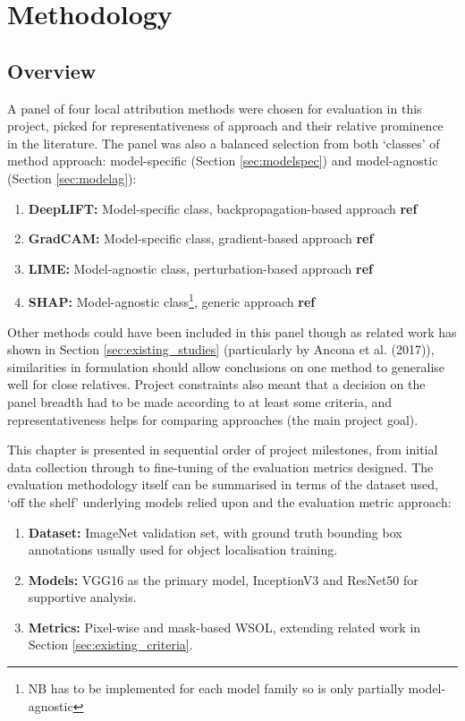 \documentclass[main]{subfiles}
\begin{document}
\chapter{Methodology}

\section{Overview}

A panel of four local attribution methods were chosen for evaluation in this project, picked for representativeness of approach and their relative prominence in the literature. The panel was also a balanced selection from both `classes' of method approach: model-specific (Section \ref{sec:modelspec}) and model-agnostic (Section \ref{sec:modelag}):

\begin{enumerate}

\item \textbf{DeepLIFT:} Model-specific class, backpropagation-based approach \textbf{ref}
\item \textbf{GradCAM:} Model-specific class, gradient-based approach \textbf{ref}
\item \textbf{LIME:} Model-agnostic class, perturbation-based approach \textbf{ref}
\item \textbf{SHAP:} Model-agnostic class\footnote{NB has to be implemented for each model family so is only partially model-agnostic}, generic approach \textbf{ref}

\end{enumerate}

Other methods could have been included in this panel though as related work has shown in Section \ref{sec:existing_studies} (particularly by Ancona et al. (2017)), similarities in formulation should allow conclusions on one method to generalise well for close relatives. Project constraints also meant that a decision on the panel breadth had to be made according to at least some criteria, and representativeness helps for comparing approaches (the main project goal).

This chapter is presented in sequential order of project milestones, from initial data collection through to fine-tuning of the evaluation metrics designed. The evaluation methodology itself can be summarised in terms of the dataset used, `off the shelf' underlying models relied upon and the evaluation metric approach:
\newpage

\begin{enumerate}
\item \textbf{Dataset:} ImageNet validation set, with ground truth bounding box annotations usually used for object localisation training. 
\item \textbf{Models:} VGG16 as the primary model, InceptionV3 and ResNet50 for supportive analysis.
\item \textbf{Metrics:} Pixel-wise and mask-based WSOL, extending related work in Section \ref{sec:existing_criteria}.
\end{enumerate}
\end{document}
